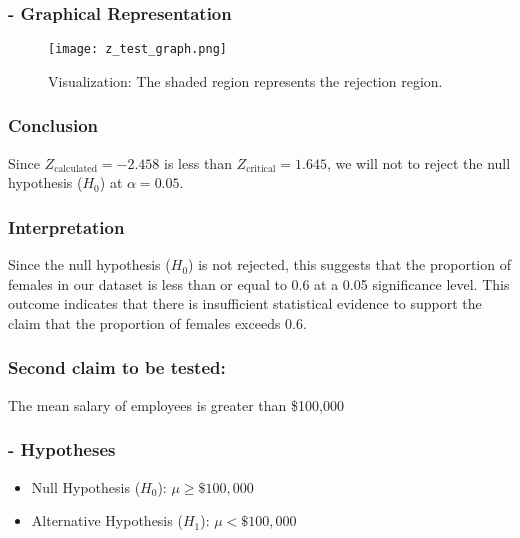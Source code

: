 \documentclass[12pt,a4paper]{article}
\begin{document}
\subsubsection*{- Graphical Representation}
\begin{figure}[htbp]
    \centering
    \texttt{[image: z\_test\_graph.png]} 
    \caption{Visualization: The shaded region represents the rejection region.}
    \label{fig:z-test}
\end{figure}



\vspace{1em}
\subsubsection*{Conclusion}
Since $Z_{\text{calculated}} = -2.458$ is less than $Z_{\text{critical}} = 1.645$, we will not to reject the null hypothesis ($H_0$) at $\alpha = 0.05$. 

\vspace{1em}

\subsubsection*{Interpretation} Since the null hypothesis ($H_0$) is not rejected, this suggests that the proportion of females in our dataset is less than or equal to 0.6 at a 0.05 significance level. This outcome indicates that there is insufficient statistical evidence to support the claim that the proportion of females exceeds 0.6.




\newpage

\subsubsection*{Second claim to be tested: }
The mean salary of employees is greater than \$100,000

\subsubsection*{- Hypotheses}
\begin{itemize}
    \item Null Hypothesis ($H_0$): $\mu \geq \$100,000$
    \item Alternative Hypothesis ($H_1$): $\mu < \$100,000$
\end{itemize}
\vspace{1em}
\end{document}

